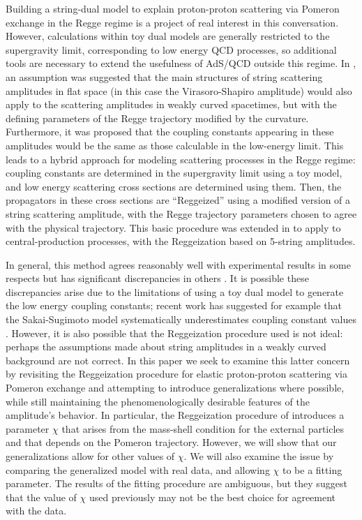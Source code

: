 \documentclass[aps, prd, preprintnumbers, floatfix, showpacs, showkeys, nofootinbib, 10pt]{revtex4-1}
\begin{document}
Building a string-dual model to explain proton-proton scattering via Pomeron exchange in the Regge regime is a project of real interest in this conversation.  However, calculations within toy dual models are generally restricted to the supergravity limit, corresponding to low energy QCD processes, so additional tools are necessary to extend the usefulness of AdS/QCD outside this regime.  In \cite{DHM}, an assumption was suggested that the main structures of string scattering amplitudes in flat space (in this case the Virasoro-Shapiro amplitude) would also apply to the scattering amplitudes in weakly curved spacetimes, but with the defining parameters of the Regge trajectory modified by the curvature.  Furthermore, it was proposed that the coupling constants appearing in these amplitudes would be the same as those calculable in the low-energy limit.  This leads to a hybrid approach for modeling scattering processes in the Regge regime: coupling constants are determined in the supergravity limit using a toy model, and low energy scattering cross sections are determined using them.  Then, the propagators in these cross sections are ``Reggeized'' using a modified version of a string scattering amplitude, with the Regge trajectory parameters chosen to agree with the physical trajectory.  This basic procedure was extended in \cite{ADHM, ADM, IRS} to apply to central-production processes, with the Reggeization based on 5-string amplitudes.  

In general, this method agrees reasonably well with experimental results in some respects but has significant discrepancies in others \cite{ADM}.  It is possible these discrepancies arise due to the limitations of using a toy dual model to generate the low energy coupling constants; recent work has suggested for example that the Sakai-Sugimoto model systematically underestimates coupling constant values \cite{low}.  However, it is also possible that the Reggeization procedure used is not ideal: perhaps the assumptions made about string amplitudes in a weakly curved background are not correct.  In this paper we seek to examine this latter concern by revisiting the Reggeization procedure for elastic proton-proton scattering via Pomeron exchange and attempting to introduce generalizations where possible, while still maintaining the phenomenologically desirable features of the amplitude's behavior.  In particular, the Reggeization procedure of \cite{DHM} introduces a parameter $\chi$ that arises from the mass-shell condition for the external particles and that depends on the Pomeron trajectory.  However, we will show that our generalizations allow for other values of $\chi$.  We will also examine the issue by comparing the generalized model with real data, and allowing $\chi$ to be a fitting parameter.  The results of the fitting procedure are ambiguous, but they suggest that the value of $\chi$ used previously may not be the best choice for agreement with the data.
\end{document}
